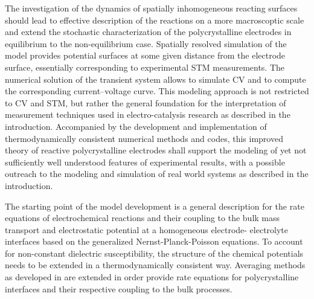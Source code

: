 \documentclass[a4paper,10pt]{article}
\begin{document}
The investigation of the dynamics of spatially inhomogeneous reacting surfaces
should lead to effective description of the reactions on a more macroscoptic scale
and extend the stochastic characterization of the polycrystalline electrodes in equilibrium
to the non-equilibrium case.
%
Spatially resolved simulation of the model provides potential surfaces at
some given distance from the electrode surface, essentially corresponding to experimental STM measurements. 
The numerical solution of the transient system allows to simulate CV and to compute the corresponding current--voltage curve. 
This modeling approach is not restricted to CV and STM, but rather the general foundation for the interpretation of 
measurement techniques used in electro-catalysis research as described in the introduction.
%
Accompanied by the development
and implementation  of thermodynamically consistent  numerical methods
and codes, this improved theory of reactive polycrystalline electrodes
shall support  the modeling  of yet  not sufficiently  well understood
features  of experimental  results, with  a possible  outreach to  the
modeling  and simulation  of real  world systems  as described  in the
introduction.




The starting point  of the model development is  a general description
for the rate  equations of electrochemical reactions and their coupling to the bulk mass transport
and electrostatic potential at a homogeneous
electrode- electrolyte  interfaces based on the generalized Nernst-Planck-Poisson equations.
To account for non-constant dielectric susceptibility, the structure of the chemical potentials
needs to be extended in a thermodynamically consistent way.
Averaging methods as  developed in
\cite{JES}  are   extended  in   order  provide  rate   equations  for
polycrystalline interfaces  and their respective coupling to the bulk processes.
\end{document}
